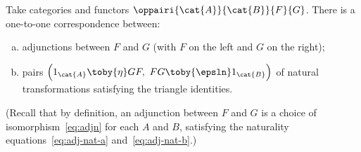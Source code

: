 \begin{thm}   
\label{thm:adj-triangle}
Take categories and functors $\oppairi{\cat{A}}{\cat{B}}{F}{G}$.  There is
a one-to-one correspondence between:
%
% 
\begin{enumerate}[(b)]
\item 
adjunctions between $F$ and $G$ (with $F$ on the left and $G$ on the
right);

\item   
\label{item:nat-triangle}
pairs $\Bigl(1_\cat{A} \toby{\eta} GF, \ FG \toby{\epsln} 1_\cat{B}\Bigr)$ of
natural transformations satisfying the triangle identities.
\end{enumerate}
\end{thm}

(Recall that by definition, an adjunction between $F$ and $G$ is a choice
of isomorphism~\eqref{eq:adjn} for each $A$ and $B$, satisfying the
naturality equations~\eqref{eq:adj-nat-a} and~\eqref{eq:adj-nat-b}.)

